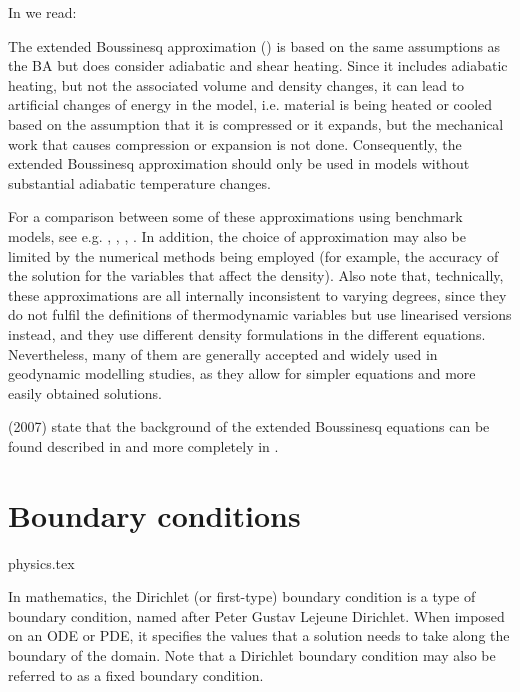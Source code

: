 In \textcite{vacp22} we read: 
\begin{displayquote}
The extended Boussinesq approximation (\cite{chyu85,oxtu78}) is based
on the same assumptions as the BA but does consider adiabatic 
and shear heating. Since it includes adiabatic heating,
but not the associated volume and density changes, it can
lead to artificial changes of energy in the model, i.e. material 
is being heated or cooled based on the assumption that
it is compressed or it expands, but the mechanical work that
causes compression or expansion is not done. Consequently,
the extended Boussinesq approximation should only be used
in models without substantial adiabatic temperature changes.

For a comparison between some of these approximations
using benchmark models, see e.g. \textcite{sthe89},
\textcite{lezh08}, \textcite{kilv10}, \textcite{gadb20}. 
In addition, the choice of approximation may
also be limited by the numerical methods being employed
(for example, the accuracy of the solution for the variables
that affect the density). Also note that, technically, these 
approximations are all internally inconsistent to varying 
degrees, since they do not fulfil the definitions of
thermodynamic variables but use linearised versions instead,
and they use different density formulations in the different 
equations. Nevertheless, many of them are generally accepted 
and widely used in geodynamic modelling studies, as
they allow for simpler equations and more easily obtained solutions.
\end{displayquote}

\textcite{yumc07} (2007) state that the background of the extended Boussinesq 
equations can be found described in \textcite{chyu85} and 
more completely in \textcite{mayu07}.

\Literature \cite{hayk91,hayk93}


\newpage
\section{Boundary conditions}
\begin{flushright} {\tiny {\color{gray} physics.tex}} \end{flushright}

In mathematics, the Dirichlet (or first-type) 
boundary condition is a type of boundary condition, named after Peter Gustav Lejeune Dirichlet.
When imposed on an ODE or PDE, it specifies the values that a solution needs 
to take along the boundary of the domain.
Note that a Dirichlet boundary condition may also be referred to as a fixed boundary condition. 

